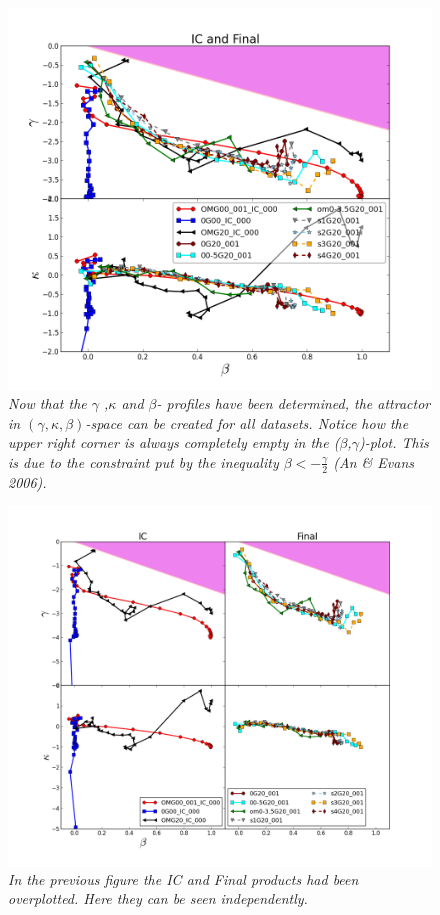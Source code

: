 \newpage
\begin{figure}[h!]
	\centering
		\includegraphics[width=1.0\linewidth]{img/Attractor_fig1.png}
		{\medskip\caption{\textsl{Now that the $\gamma$ ,$\kappa $ and $\beta$- profiles have been determined, the attractor in $(\gamma,\kappa,\beta)$-space can be created for all datasets. Notice how the upper right corner is always completely empty in the ($\beta$,$\gamma$)-plot. This is due to the constraint put by the inequality $ \beta < -\frac{\gamma}{2}$ (An \& Evans 2006).
\label{fig:Rv}}}}
\end{figure} 

\begin{figure}[h!]
	\centering
		\includegraphics[width=1.0\linewidth]{img/Attractor_fig2.png}
		{\medskip\caption{\textsl{In the previous figure the IC and Final products had been overplotted. Here they can be seen independently.
\label{fig:Rv}}}}
\end{figure} 


